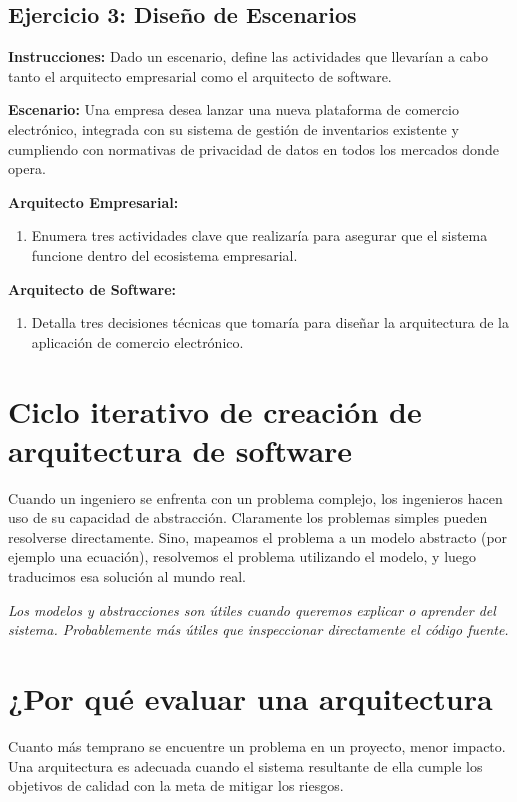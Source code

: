 \subsection{Ejercicio 3: Diseño de Escenarios}
\textbf{Instrucciones:} Dado un escenario, define las actividades que llevarían a cabo tanto el arquitecto empresarial como el arquitecto de software.

\textbf{Escenario:} Una empresa desea lanzar una nueva plataforma de comercio electrónico, integrada con su sistema de gestión de inventarios existente y cumpliendo con normativas de privacidad de datos en todos los mercados donde opera.

\textbf{Arquitecto Empresarial:}
\begin{enumerate}
    \item Enumera tres actividades clave que realizaría para asegurar que el sistema funcione dentro del ecosistema empresarial.
\end{enumerate}

\textbf{Arquitecto de Software:}
\begin{enumerate}
    \item Detalla tres decisiones técnicas que tomaría para diseñar la arquitectura de la aplicación de comercio electrónico.
\end{enumerate}

\section{Ciclo iterativo de creación de arquitectura de software}
Cuando un ingeniero se enfrenta con un problema complejo, los ingenieros hacen uso de su capacidad de abstracción.  Claramente los problemas simples pueden resolverse directamente. Sino, mapeamos el problema a un modelo abstracto (por ejemplo una ecuación), resolvemos el problema utilizando el modelo, y luego traducimos esa solución al mundo real.


\begin{flushright}
    \textit{Los modelos y abstracciones son útiles cuando queremos explicar o aprender del sistema. Probablemente más útiles que inspeccionar directamente el código fuente. }
\end{flushright}



\newpage
\section{¿Por qué evaluar una arquitectura}
Cuanto más temprano se encuentre un problema en un proyecto, menor impacto. Una arquitectura es adecuada cuando el sistema resultante de ella cumple los objetivos de calidad con la meta de mitigar los riesgos. 



